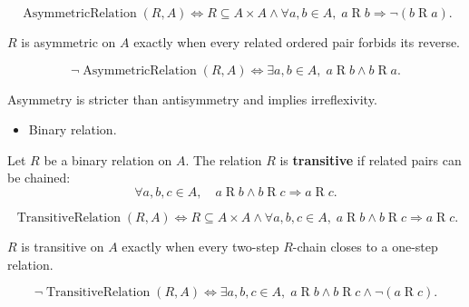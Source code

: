 \begin{remark*}
\[
\operatorname{AsymmetricRelation}(R,A)
\Longleftrightarrow
R\subseteq A\times A
\land
\forall a,b\in A,\; a\mathrel{R}b \Rightarrow \lnot(b\mathrel{R}a).
\]
\end{remark*}

\begin{remark*}
$R$ is asymmetric on $A$ exactly when every related ordered pair forbids its
reverse.
\end{remark*}

\begin{remark*}
\[
\neg\operatorname{AsymmetricRelation}(R,A)
\Longleftrightarrow
\exists a,b\in A,\; a\mathrel{R}b \land b\mathrel{R}a.
\]
\end{remark*}

\begin{remark*}[Interpretation]
Asymmetry is stricter than antisymmetry and implies irreflexivity.
\end{remark*}

\begin{remark*}[Dependencies]
\begin{itemize}
  \item Binary relation.
\end{itemize}
\end{remark*}

\begin{definition}
\label{def:rel-transitive}
Let $R$ be a binary relation on $A$.
The relation $R$ is \textbf{transitive} if related pairs can be chained:
\[
\forall a,b,c \in A,\quad
a \mathrel{R} b \land b \mathrel{R} c \Rightarrow a \mathrel{R} c.
\]
\end{definition}

\begin{remark*}
\[
\operatorname{TransitiveRelation}(R,A)
\Longleftrightarrow
R\subseteq A\times A
\land
\forall a,b,c\in A,\;
a\mathrel{R}b \land b\mathrel{R}c \Rightarrow a\mathrel{R}c.
\]
\end{remark*}

\begin{remark*}
$R$ is transitive on $A$ exactly when every two-step $R$-chain closes to a
one-step relation.
\end{remark*}

\begin{remark*}
\[
\neg\operatorname{TransitiveRelation}(R,A)
\Longleftrightarrow
\exists a,b,c\in A,\;
a\mathrel{R}b \land b\mathrel{R}c \land \lnot(a\mathrel{R}c).
\]
\end{remark*}

